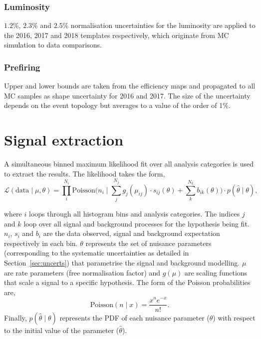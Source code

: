 \subsubsection{Luminosity}
$1.2\%$, $2.3\%$ and $2.5\%$ normalisation uncertainties for the luminosity are applied to the 2016, 2017 and 2018 templates respectively, which originate from MC simulation to data comparisons.

\subsubsection{Prefiring}
Upper and lower bounds are taken from the efficiency maps and propagated to all \ac{MC} samples as shape uncertainty for 2016 and 2017.
The size of the uncertainty depends on the event topology but averages to a value of the order of 1\%.

\section{Signal extraction}
\label{sec:sig_ext}

A simultaneous binned maximum likelihood fit over all analysis categories is used to extract the results.
The likelihood takes the form,
\begin{equation}
\mathcal{L}(\text{data}\mid\mu,\theta) = \prod_{i}^{N_{i}} \text{Poisson} \Big(n_{i} \mid \sum_{j}^{N_{j}} g_{j}(\mu_{ij}) \cdot s_{ij}(\theta) + \sum_{k}^{N_{k}} b_{ik}(\theta)\Big) \cdot p(\hat{\theta} \mid \theta),
\label{eqn:likelihood}
\end{equation}

where $i$ loops through all histogram bins and analysis categories.
The indices $j$ and $k$ loop over all signal and background processes for the hypothesis being fit.
$n_i$, $s_i$ and $b_i$ are the data observed, signal and background expectation respectively in each bin.
$\theta$ represents the set of nuisance parameters (corresponding to the systematic uncertainties as detailed in Section~\ref{sec:uncerts}) that parametrise the signal and background modelling.
$\mu$ are rate parameters (free normalisation factor) and $g(\mu)$ are scaling functions that scale a signal to a specific hypothesis.
The form of the Poisson probabilities are,
\begin{equation}
\text{Poisson} (n \mid x) = \frac{x^{n}e^{-x}}{n!}.
\end{equation}
Finally, $p(\hat{\theta} \mid \theta)$ represents the \ac{PDF} of each nuisance parameter ($\theta$) with respect to the initial value of the parameter ($\hat{\theta}$). \\

